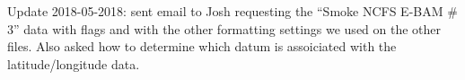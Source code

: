 Update 2018-05-2018: sent email to Josh requesting the ``Smoke NCFS E-BAM \# 3'' data with flags and with the other formatting settings we used on the other files. Also asked how to determine which datum is assoiciated with the latitude/longitude data.

% 
% 
% 


